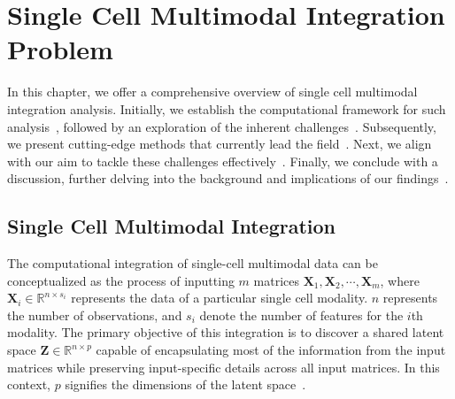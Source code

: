 %
%
\chapter{Single Cell Multimodal Integration Problem}
\label{chapter:problem_inte}
\graphicspath{{chapter3/figs/}}


In this chapter, we offer a comprehensive overview of single cell multimodal integration analysis. Initially, we establish the computational framework for such analysis~, followed by an exploration of the inherent challenges~. Subsequently, we present cutting-edge methods that currently lead the field~. Next, we align with our aim to tackle these challenges effectively~. Finally, we conclude with a discussion, further delving into the background and implications of our findings~.




\section{Single Cell Multimodal Integration}
\label{bgInte:introduction}
The computational integration of single-cell multimodal data can be conceptualized as the process of inputting $m$ matrices $\mathbf{X}_1, \mathbf{X}_2,\cdots, \mathbf{X}_m$, where $\mathbf{X}_i\in \mathbb{R}^{n\times s_i}$ represents the data of a particular single cell modality. $n$ represents the number of observations, and $s_i$ denote the number of features for the $i$th modality. The primary objective of this integration is to discover a shared latent space $\mathbf{Z}\in\mathbb{R}^{n\times p}$ capable of encapsulating most of the information from the input matrices while preserving input-specific details across all input matrices. In this context, $p$ signifies the dimensions of the latent space~.

